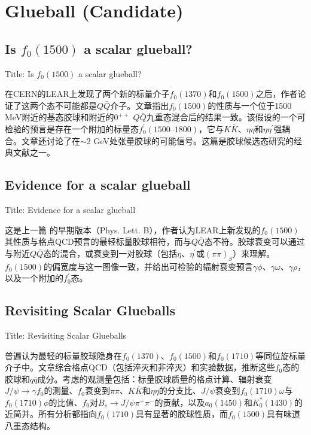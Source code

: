\documentclass{article}
\begin{document}

\section{Glueball (Candidate)}

\subsection{Is $f_{0}(1500)$ a scalar glueball?}

Title: \quad Is $f_{0}(1500)$ a scalar glueball? \cite{Amsler_1996}

在CERN的LEAR上发现了两个新的标量介子$f_{0}(1370)$和$f_{0}(1500)$之后，作者论证了这两个态不可能都是$Q\bar{Q}$介子。文章指出$f_{0}(1500)$的性质与一个位于1500 MeV附近的基态胶球和附近的$0^{++}$ $Q\bar{Q}$九重态混合后的结果一致。该假设的一个可检验的预言是存在一个附加的标量态$f_{0}^{\prime}(1500\text{--}1800)$，它与$K\bar{K}$、$\eta\eta$和$\eta\eta^{\prime}$强耦合。文章还讨论了在$\sim$2 GeV处张量胶球的可能信号。这篇是胶球候选态研究的经典文献之一。


\subsection{Evidence for a scalar glueball}

Title: \quad Evidence for a scalar glueball \cite{Amsler_1995}

这是上一篇 \cite{Amsler_1996} 的早期版本（Phys. Lett. B），作者认为LEAR上新发现的$f_{0}(1500)$其性质与格点QCD预言的最轻标量胶球相符，而与$Q\bar{Q}$态不符。胶球衰变可以通过与附近$Q\bar{Q}$态的混合，或衰变到一对胶球（包括$\eta$、$\eta^{\prime}$或$(\pi\pi)_{S}$）来理解。$f_{0}(1500)$的偏宽度与这一图像一致，并给出可检验的辐射衰变预言$\gamma\phi$、$\gamma\omega$、$\gamma\rho$，以及一个附加的$f_{0}^{\prime}$态。


\subsection{Revisiting Scalar Glueballs}

Title: \quad Revisiting Scalar Glueballs \cite{Cheng_2015}

普遍认为最轻的标量胶球隐身在$f_{0}(1370)$、$f_{0}(1500)$和$f_{0}(1710)$等同位旋标量介子中。文章综合格点QCD（包括淬灭和非淬灭）和实验数据，推断这些$f_{0}$态的胶球和$q\bar{q}$成分。考虑的观测量包括：标量胶球质量的格点计算、辐射衰变$J/\psi\to\gamma f_{0}$的测量、$f_{0}$衰变到$\pi\pi$、$K\bar{K}$和$\eta\eta$的分支比、$J/\psi$衰变到$f_{0}(1710)\omega$与$f_{0}(1710)\phi$的比值、$f_{0}$对$B_{s}\to J/\psi\pi^{+}\pi^{-}$的贡献，以及$a_{0}(1450)$和$K_{0}^{*}(1430)$的近简并。所有分析都指向$f_{0}(1710)$具有显著的胶球性质，而$f_{0}(1500)$具有味道八重态结构。
\end{document}

